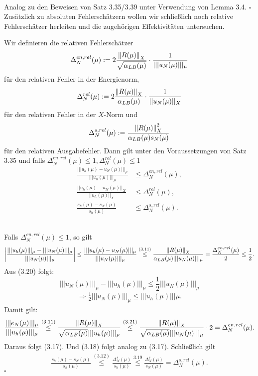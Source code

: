 \\
Analog zu den Beweisen von Satz 3.35/3.39 unter Verwendung von Lemma 3.4.
\hfill $\square$\\

Zusätzlich zu absoluten Fehlerschätzern wollen wir schließlich noch relative Fehlerschätzer herleiten und die zugehörigen Effektivitäten untersuchen.

Wir definieren die relativen Fehlerschätzer 
\[
\Delta_N^{en,rel}(\mu) := 2\frac{\left\Vert R(\mu)\right\Vert_X}{\sqrt{\alpha_{LB}(\mu)}}\cdot \frac{1}{|||u_N(\mu)|||_\mu}
\]
für den relativen Fehler in der Energienorm,
\[
\Delta_N^{rel}(\mu) := 2\frac{\left\Vert R(\mu)\right\Vert_X}{\alpha_{LB}(\mu)}\cdot \frac{1}{||u_N(\mu)||_X}
\]
für den relativen Fehler in der $X$-Norm und 
\[
\Delta_N^{s,rel}(\mu) := \frac{\left\Vert R(\mu)\right\Vert_X^2}{\alpha_{LB}(\mu)s_N(\mu)}
\]
für den relativen Ausgabefehler.
Dann gilt unter den Voraussetzungen von Satz 3.35 und falls $\Delta_N^{en,rel}(\mu)\le 1, \Delta_N^{rel}(\mu)\le 1$
\begin{align}
\frac{|||u_h(\mu)-u_N(\mu)|||_\mu}{|||u_h(\mu)|||_\mu} &\le \Delta_N^{en,rel}(\mu),\\
\frac{||u_h(\mu)-u_N(\mu)||_X}{||u_h(\mu)||_X} &\le \Delta_N^{rel}(\mu),\\
\frac{s_h(\mu)-s_N(\mu)}{s_h(\mu)} &\le \Delta_N^{s,rel}(\mu).
\end{align}

\\
Falls $\Delta_N^{en,rel}(\mu)\le 1$, so gilt
\begin{align}
\left\vert\frac{|||u_h(\mu)|||_\mu-|||u_N(\mu)|||_\mu}{|||u_N(\mu)|||_\mu}\right\vert \le \frac{|||u_h(\mu)-u_N(\mu)|||_\mu}{|||u_N(\mu)|||_\mu} \stackrel{(3.11)}{\le} \frac{\left\Vert R(\mu)\right\Vert_X}{\alpha_{LB}(\mu)|||u_N(\mu)|||_\mu} = \frac{\Delta_N^{en,rel}(\mu)}{2} \le \frac{1}{2}.
\end{align}
Aus (3.20) folgt:
\[
|||u_N(\mu)|||_\mu - |||u_h(\mu)|||_\mu \le \frac{1}{2} |||u_N(\mu)|||_\mu
\]
\begin{align}
\Rightarrow \frac{1}{2} |||u_N(\mu)|||_\mu \le |||u_h(\mu)|||\mu.
\end{align}
Damit gilt:
\begin{align*}
\frac{|||e_N(\mu)|||_\mu}{|||u_h(\mu)|||_\mu} \stackrel{(3.11)}{\le} \frac{\left\Vert R(\mu)\right\Vert_X}{\sqrt{\alpha_{LB}(\mu)}|||u_h(\mu)|||_\mu} \stackrel{(3.21)}{\le} \frac{\left\Vert R(\mu)\right\Vert_X}{\sqrt{\alpha_{LB}(\mu)}|||u_N(\mu)|||_\mu}\cdot 2 = \Delta_N^{en,rel}(\mu).
\end{align*}
Daraus folgt (3.17).
Und (3.18) folgt analog zu (3.17).
Schließlich gilt 
\begin{align*}
\frac{s_h(\mu)-s_N(\mu)}{s_h(\mu)} \stackrel{(3.12)}{\le} \frac{\Delta_N^{s}(\mu)}{s_h(\mu)} \stackrel{3.19}{\le} \frac{\Delta_N^s(\mu)}{s_N(\mu)} = \Delta_N^{s,rel}(\mu).
\end{align*}
\hfill $\square$

